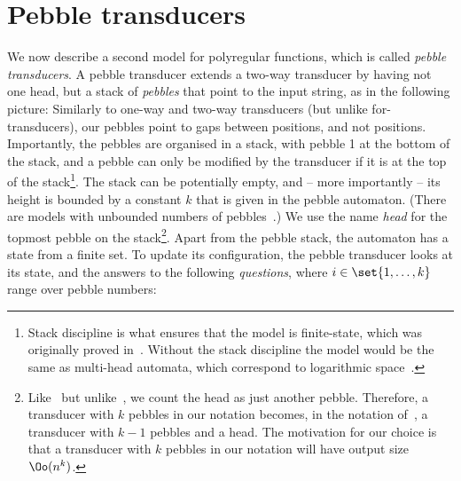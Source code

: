 \section{Pebble transducers}
\label{sec:polyregular-pebble}
We now describe a second model for polyregular functions, which is called \emph{pebble transducers}. 
A pebble transducer extends a two-way transducer by having not one head, but a stack of  \emph{pebbles} that point to the input string, as in the following picture:
Similarly to one-way and  two-way transducers (but unlike for-transducers), our pebbles point to gaps between positions, and not positions. 
Importantly, the pebbles are organised in a stack, with pebble 1 at the bottom of the stack, and a  pebble can only be modified by the transducer if it is at the top of the stack\footnote{
    \label{footnote:stack-discipline}
    Stack discipline is what ensures that the model is finite-state, which was originally proved in~\cite[Theorem 4.2]{lewenstein1996}. Without the stack discipline the model would be the same as multi-head automata, which correspond to logarithmic space~\cite[Corollary 3.5]{ibarra1971}.}.
The stack can be potentially empty, and -- more importantly -- its height is bounded by a constant $k$ that is given in the pebble automaton. (There are models with unbounded numbers of pebbles~\cite{engelfriet2007}.)
We use the name \emph{head} for the topmost pebble on the stack\footnote{Like~\cite{milo2003} but unlike~\cite{lewenstein1996, engelfriet2002}, we count the head as just another pebble. Therefore, a transducer with $k$ pebbles in our notation becomes, in the notation  of~\cite{lewenstein1996, engelfriet2002}, a transducer with $k-1$ pebbles and a head. The motivation for our choice is that a transducer with $k$ pebbles in our notation will have output size $\Oo(n^k)$.}. Apart from the pebble stack, the automaton has a state from a finite set. To update its configuration, the pebble transducer looks at its state, and the answers to the  following \emph{questions}, where $i \in \set{1,\ldots,k}$ range over pebble numbers:
